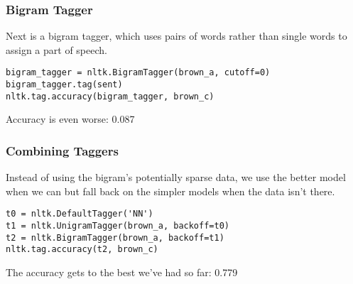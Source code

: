 \documentclass{beamer}
\begin{document}
\begin{frame}[fragile]

\frametitle{Bigram Tagger} 

Next is a bigram tagger, which uses pairs of words rather than single words to assign a part of speech.

\footnotesize
\begin{verbatim}
bigram_tagger = nltk.BigramTagger(brown_a, cutoff=0)
bigram_tagger.tag(sent)
nltk.tag.accuracy(bigram_tagger, brown_c)
\end{verbatim}

\pause
Accuracy is even worse: 0.087
\end{frame}

\begin{frame}[fragile]
\frametitle{Combining Taggers} 

Instead of using the bigram's potentially sparse data, we use the better model when we can but fall back on the simpler models when the data isn't there.

\footnotesize
\begin{verbatim}
t0 = nltk.DefaultTagger('NN')
t1 = nltk.UnigramTagger(brown_a, backoff=t0)
t2 = nltk.BigramTagger(brown_a, backoff=t1)
nltk.tag.accuracy(t2, brown_c)
\end{verbatim}

\pause
The accuracy gets to the best we've had so far: 0.779
\end{frame}
\end{document}
